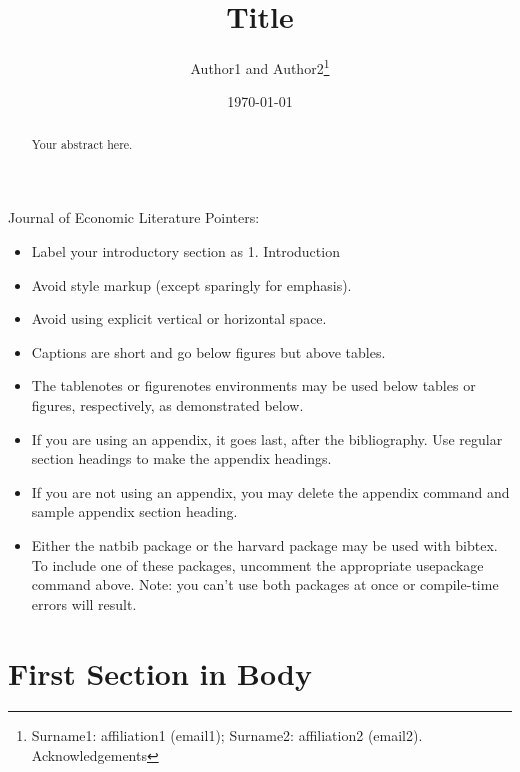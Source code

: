 \documentclass[JEL]{AEA}
\begin{document}
\title{Title}
\author{Author1 and Author2\thanks{%
Surname1: affiliation1 (email1); Surname2: affiliation2
(email2). Acknowledgements}}
\date{\today}

\begin{abstract}
Your abstract here.
\end{abstract}

\maketitle

Journal of Economic Literature Pointers:

\begin{itemize}
\item Label your introductory section as 1. Introduction

\item Avoid style markup (except sparingly for emphasis).

\item Avoid using explicit vertical or horizontal space.

\item Captions are short and go below figures but above tables.

\item The tablenotes or figurenotes environments may be used below tables
or figures, respectively, as demonstrated below.

\item If you are using an appendix, it goes last, after the bibliography.
Use regular section headings to make the appendix headings.

\item If you are not using an appendix, you may delete the appendix command
and sample appendix section heading.

\item Either the natbib package or the harvard package may be used with bibtex.
To include one of these packages, uncomment the appropriate usepackage command
above. Note: you can't use both packages at once or compile-time errors will result.

\end{itemize}

\section{First Section in Body}
\end{document}
